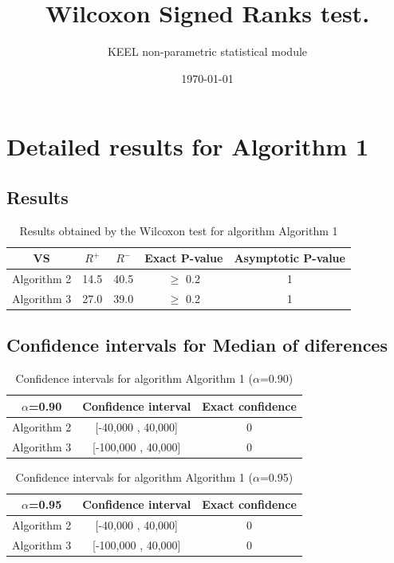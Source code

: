 \documentclass[a4paper,10pt]{article}
\title{Wilcoxon Signed Ranks test.}
\date{\today}
\author{KEEL non-parametric statistical module}
\begin{document}
\pagestyle{empty}
\maketitle
\thispagestyle{empty}



\section{Detailed results for Algorithm 1}


\subsection{Results}

\begin{table}[!htp]
\centering\small
\begin{tabular}{
|c|c|c|c|c|}
\hline
 VS & $R^{+}$ & $R^{-}$ & Exact P-value & Asymptotic P-value \\ \hline 
Algorithm 2 & 14.5 & 40.5 & $\geq$ 0.2 & 1\\ \hline 
Algorithm 3 & 27.0 & 39.0 & $\geq$ 0.2 & 1\\ \hline 

\end{tabular}
\caption{Results obtained by the Wilcoxon test for algorithm Algorithm 1}
\end{table}

\subsection{Confidence intervals for Median of diferences}

\begin{table}[!htp]
\centering\small
\begin{tabular}{
|c|c|c|}
\hline
 $\alpha$=0.90 & Confidence interval & Exact confidence \\ \hline 
Algorithm 2 & [-40,000 , 40,000] & 0\\ \hline 
Algorithm 3 & [-100,000 , 40,000] & 0\\ \hline 

\end{tabular}
\caption{Confidence intervals for algorithm Algorithm 1 ($\alpha$=0.90)}
\end{table}
\begin{table}[!htp]
\centering\small
\begin{tabular}{
|c|c|c|}
\hline
 $\alpha$=0.95 & Confidence interval & Exact confidence \\ \hline 
Algorithm 2 & [-40,000 , 40,000] & 0\\ \hline 
Algorithm 3 & [-100,000 , 40,000] & 0\\ \hline 

\end{tabular}
\caption{Confidence intervals for algorithm Algorithm 1 ($\alpha$=0.95)}
\end{table}
\end{document}
